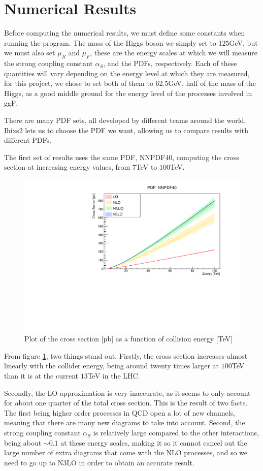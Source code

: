 \documentclass[EPJ,twocolumn]{webofc}
\begin{document}
\section{\label{sec4}Numerical Results}

Before computing the numerical results,  we must define some constants when running the program. The mass of the Higgs boson we simply set to $125$GeV, but we must also set $\mu_R$ and $\mu_F$, these are the energy scales at which we will measure the strong coupling constant $\alpha_S$, and the PDFs, respectively. Each of these quantities will vary depending on the energy level at which they are measured, for this project, we chose to set both of them to $62.5$GeV, half of the mass of the Higgs, as a good middle ground for the energy level of the processes involved in ggF.

There are many PDF sets, all developed by different teams around the world. Ihixs2 lets us to choose the PDF we want, allowing us to compare results with different PDFs.

The first set of results uses the same PDF, NNPDF40, computing the cross section at increasing energy values, from $7$TeV to $100$TeV.

\begin{figure}[ht]
    \centering
    \includegraphics[width=.8\columnwidth]{Images/NNPDF40_XS.pdf}
    \caption{Plot of the cross section [pb] as a function of collision energy [TeV] }
    \label{results1}
\end{figure}
From figure \ref{results1}, two things stand out. Firstly, the cross section increases almost linearly with the collider energy, being around twenty times larger at $100$TeV than it is at the current $13$TeV in the LHC.

Secondly, the LO approximation is very inaccurate, as it seems to only account for about one quarter of the total cross section. This is the result of two facts. The first being higher order processes in QCD open a lot of new channels, meaning that there are many new diagrams to take into account. Second, the strong coupling constant $\alpha_S$ is relatively large compared to the other interactions, being about $\sim 0.1$ at these energy scales, making it so it cannot cancel out the large number of extra diagrams that come with the NLO processes, and so we need to go up to N3LO in order to obtain an accurate result. 
\end{document}
